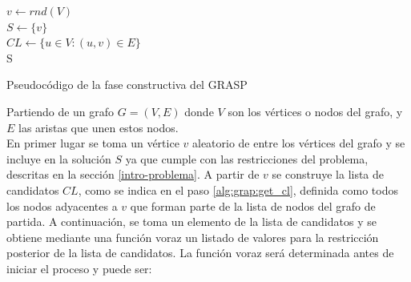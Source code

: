 \begin{algorithm}[H]
	\SetAlgoLined
	$ v \gets rnd( V ) $ \label{alg:grap:get_v} \\[0.2cm]
	$ S \gets \{ v \} $ \label{alg:grap:add_v_to_s} \\[0.2cm]
	$ CL \gets \{u \in V : (u, v) \in E\} $ \label{alg:grap:get_cl} \\[0.2cm]
	\Return S \label{alg:grap:rt_s}
	\caption{Pseudocódigo de la fase constructiva del GRASP}
	\label{alg:grasp}
\end{algorithm}

Partiendo de un grafo $G=(V, E)$ donde $V$ son los vértices o nodos del grafo, y $E$ las aristas que unen estos nodos.\\
En primer lugar se toma un vértice $v$ aleatorio de entre los vértices del grafo y se incluye en la solución $S$ ya que cumple con las restricciones del problema, descritas en la sección \ref{intro-problema}. A partir de $v$ se construye la lista de candidatos $CL$, como se indica en el paso \ref{alg:grap:get_cl}, definida como todos los nodos adyacentes a $v$ que forman parte de la lista de nodos del grafo de partida. A continuación, se toma un elemento de la lista de candidatos y se obtiene mediante una función voraz un listado de valores para la restricción posterior de la lista de candidatos.
La función voraz será determinada antes de iniciar el proceso y puede ser:


